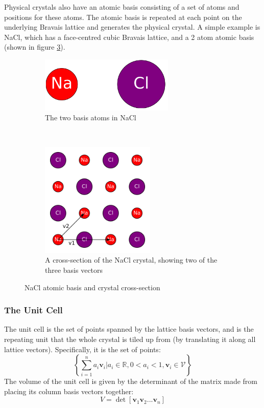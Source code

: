 \documentclass[12pt]{article}
\begin{document}
Physical crystals also have an atomic basis consisting of a set of atoms and positions for these atoms. The atomic basis is repeated at each point on the underlying Bravais lattice and generates the physical crystal. 
A simple example is NaCl, which has a face-centred cubic Bravais lattice, and a 2 atom atomic basis (shown in figure \ref{fig:nacl_lattice}).
\begin{figure}[t!]
    \centering
    \begin{subfigure}[t]{0.5\textwidth}
        \includegraphics[width=0.7\textwidth]{./figures/na_cl_basis.png}
        \caption{The two basis atoms in NaCl}
	\label{fig:nacl_basis}
    \end{subfigure}%
    ~ 
    \begin{subfigure}[t]{0.5\textwidth}
        \centering
        \includegraphics[width=0.6\textwidth]{./figures/na_cl_crosssection.png}
        \caption{A cross-section of the NaCl crystal, showing two of the three basis vectors}
	\label{fig:nacl_crosssection}
    \end{subfigure}
    \caption{NaCl atomic basis and crystal cross-section}
\label{fig:nacl_lattice}
\end{figure}
\subsubsection{The Unit Cell}
The unit cell is the set of points spanned by the lattice basis vectors, and is the repeating unit that the whole crystal is tiled up from (by translating it along all lattice vectors). Specifically, it is the set of points:
\begin{equation}\label{eq:unit_cell}
	\left\{\sum _{i=1}^n a_i \mathbf v_i \Big| a_i \in \mathbb{R}, 0<a_i<1, \mathbf{v}_i \in \mathcal V \right\}
\end{equation}
The volume of the unit cell is given by the determinant of the matrix made from placing its column basis vectors together:
\begin{equation}
	V = \det [\mathbf{v}_1 \mathbf{v}_2 ... \mathbf{v}_n]
\end{equation}
\end{document}

